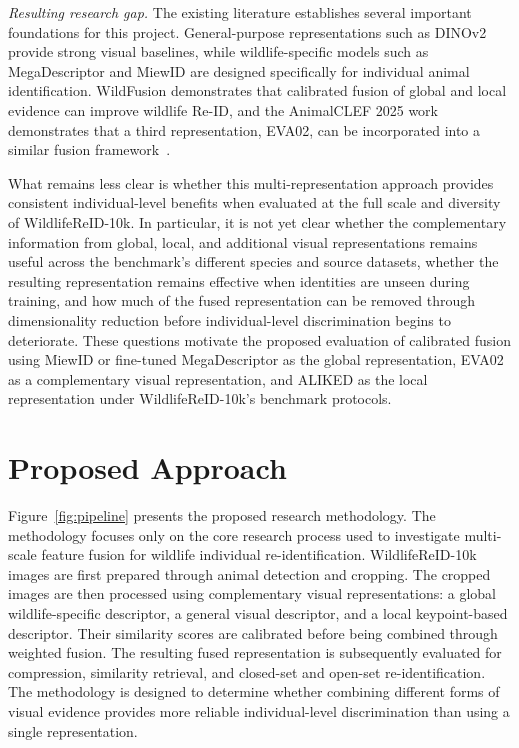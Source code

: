 \documentclass[runningheads]{llncs}
\begin{document}
\emph{Resulting research gap.}
The existing literature establishes several important foundations for this
project. General-purpose representations such as DINOv2 provide strong
visual baselines, while wildlife-specific models such as MegaDescriptor and
MiewID are designed specifically for individual animal identification.
WildFusion demonstrates that calibrated fusion of global and local evidence
can improve wildlife Re-ID, and the AnimalCLEF 2025 work demonstrates that a
third representation, EVA02, can be incorporated into a similar fusion
framework~\cite{cermak2024wildlifedatasets,cermak2024wildfusion,otarashvili2024multispecies,kim2025fusion}.

What remains less clear is whether this multi-representation approach
provides consistent individual-level benefits when evaluated at the full
scale and diversity of WildlifeReID-10k. In particular, it is not yet clear
whether the complementary information from global, local, and additional
visual representations remains useful across the benchmark's different
species and source datasets, whether the resulting representation remains
effective when identities are unseen during training, and how much of the
fused representation can be removed through dimensionality reduction before
individual-level discrimination begins to deteriorate. These questions
motivate the proposed evaluation of calibrated fusion using MiewID or
fine-tuned MegaDescriptor as the global representation, EVA02 as a
complementary visual representation, and ALIKED as the local representation
under WildlifeReID-10k's benchmark protocols.

\section{Proposed Approach}

Figure~\ref{fig:pipeline} presents the proposed research methodology. The methodology focuses only
on the core research process used to investigate multi-scale feature fusion for wildlife individual
re-identification. WildlifeReID-10k images are first prepared through animal detection and cropping.
The cropped images are then processed using complementary visual representations: a global
wildlife-specific descriptor, a general visual descriptor, and a local keypoint-based descriptor.
Their similarity scores are calibrated before being combined through weighted fusion. The resulting
fused representation is subsequently evaluated for compression, similarity retrieval, and
closed-set and open-set re-identification. The methodology is designed to determine whether combining
different forms of visual evidence provides more reliable individual-level discrimination than using
a single representation.
\end{document}
